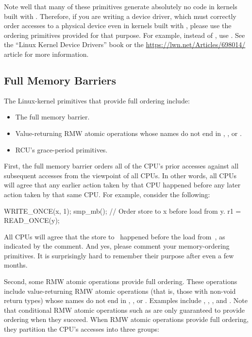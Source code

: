 Note well that many of these primitives generate absolutely no code
in kernels built with .
Therefore, if you are writing a device driver, which must correctly
order accesses to a physical device even in kernels built with
, please use the ordering primitives provided for
that purpose.
For example, instead of , use .
See the ``Linux Kernel Device Drivers'' book or the
\url{https://lwn.net/Articles/698014/} article for more information.


\subsection{Full Memory Barriers}

The Linux-kernel primitives that provide full ordering include:

\begin{itemize}
 \item	The  full memory barrier.

 \item	Value-returning RMW atomic operations whose names do not end in
	, , or .

 \item	RCU's grace-period primitives.
\end{itemize}

First, the  full memory barrier orders all of the CPU's prior
accesses against all subsequent accesses from the viewpoint of all CPUs.
In other words, all CPUs will agree that any earlier action taken
by that CPU happened before any later action taken by that same CPU\@.
For example, consider the following:

\begin{VerbatimU}
	WRITE_ONCE(x, 1);
	smp_mb(); // Order store to x before load from y.
	r1 = READ_ONCE(y);
\end{VerbatimU}

All CPUs will agree that the store to~ happened before the load
from~, as indicated by the comment.
And yes, please comment your memory-ordering primitives.
It is surprisingly hard to remember their purpose after even a few months.

Second, some RMW atomic operations provide full ordering.
These operations include value-returning RMW atomic operations
(that is, those with non-void return types) whose names do not end in
, , or .
Examples include , ,
, and .
Note that conditional RMW atomic operations such as  are
only guaranteed to provide ordering when they succeed.
When RMW atomic operations provide full ordering, they partition the
CPU's accesses into three groups:

